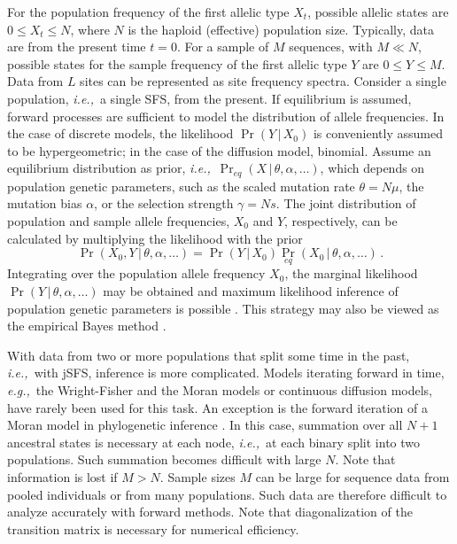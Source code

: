 \documentclass[preprint]{elsarticle}
\newcommand\given{{\,|\,}}
\newcommand\eg{{\it e.g.,}}
\newcommand\ie{{\it i.e.,}}
\begin{document}
For the population frequency of the first allelic type $X_t$, possible allelic states are $0\leq X_t \leq N$, where $N$ is the haploid (effective) population size. Typically, data are from the present time $t=0$. For a sample of $M$ sequences, with $M\ll N$, possible states for the sample frequency of the first allelic type $Y$ are $0\leq Y \leq M$. Data from $L$ sites can be represented as site frequency spectra. Consider a single population, \ie\ a single SFS, from the present. If equilibrium is assumed, forward processes are sufficient to model the distribution of allele frequencies. In the case of discrete models, the likelihood $\Pr(Y\given X_0)$ is conveniently assumed to be hypergeometric; in the case of the diffusion model, binomial. Assume an equilibrium %
distribution as prior, \ie\ $\Pr_{eq}(X\given \theta,\alpha,\dots)$, which depends on population genetic parameters, such as the scaled mutation rate $\theta=N\mu$, the mutation bias $\alpha$, or the selection strength $\gamma=Ns$. The joint distribution of population and sample allele frequencies, $X_0$ and $Y$, respectively, can be calculated by multiplying the likelihood with the prior
\begin{equation}
 \Pr(X_0,Y\given \theta,\alpha,\dots)=\Pr(Y\given X_0){\Pr}_{eq} (X_{0}\given \theta,\alpha,\dots)\,.
\end{equation}
Integrating over the population allele frequency $X_0$, the marginal likelihood $\Pr(Y\given \theta,\alpha,\dots)$ may be obtained and maximum likelihood inference of population genetic parameters is possible \citep{Vogl14b,Vogl15}. This strategy may also be viewed as the empirical Bayes method \citep[\eg][]{Carl00}.

With data from two or more populations that split some time in the past, \ie\ with jSFS, inference is more complicated. Models iterating forward in time, \eg\ the Wright-Fisher and the Moran models or continuous diffusion models, have rarely been used for this task. An exception is the forward iteration of a Moran model in phylogenetic inference \citep{DeMaio2015}. In this case, summation over all $N+1$ ancestral states is necessary at each node, \ie\ at each binary split into two populations. Such summation becomes difficult with large $N$. Note that information is lost if $M>N$. Sample sizes $M$ can be large for sequence data from pooled individuals or from many populations. Such data are therefore difficult to analyze accurately with forward methods. Note that diagonalization of the transition matrix is necessary for numerical efficiency. 
\end{document}
